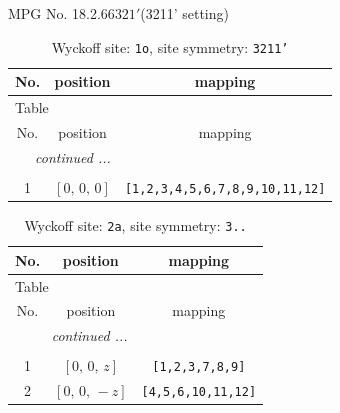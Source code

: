 \documentclass[fleqn,8pt]{jsarticle}
\begin{document}
\setcounter{MaxMatrixCols}{32}

\renewcommand{\tablename}{Table~}
\renewcommand{\figurename}{Figure~}
\begin{center}
\LARGE
MPG No. 18.2.66\quad$321'$\quad(3211' setting)
\end{center}
\renewcommand{\arraystretch}{1.2}
\begin{longtable}{ccc}
\caption{Wyckoff site: {\tt 1o}, site symmetry: {\tt 3211'}}
 \\
 \hline \hline
No. & position & mapping \\ \hline \endfirsthead

\multicolumn{2}{l}{\tablename\ \thetable{}} \\
 \hline \hline
No. & position & mapping \\ \hline \endhead

 \hline \hline
\multicolumn{2}{r}{\footnotesize\it continued ...} \\ \endfoot

 \hline \hline
\multicolumn{2}{r}{} \\ \endlastfoot

1 & $\left[ 0,\, 0,\, 0 \right]$ & {\tt [1,2,3,4,5,6,7,8,9,10,11,12]} \\
\end{longtable}
\renewcommand{\arraystretch}{1.2}
\begin{longtable}{ccc}
\caption{Wyckoff site: {\tt 2a}, site symmetry: {\tt 3..}}
 \\
 \hline \hline
No. & position & mapping \\ \hline \endfirsthead

\multicolumn{2}{l}{\tablename\ \thetable{}} \\
 \hline \hline
No. & position & mapping \\ \hline \endhead

 \hline \hline
\multicolumn{2}{r}{\footnotesize\it continued ...} \\ \endfoot

 \hline \hline
\multicolumn{2}{r}{} \\ \endlastfoot

1 & $\left[ 0,\, 0,\, z \right]$ & {\tt [1,2,3,7,8,9]} \\ \hline
2 & $\left[ 0,\, 0,\, - z \right]$ & {\tt [4,5,6,10,11,12]} \\
\end{longtable}
\renewcommand{\arraystretch}{1.2}
\end{document}
